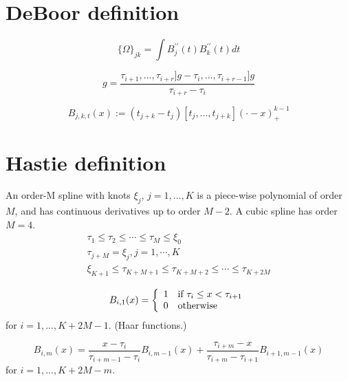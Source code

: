 \documentclass {article}
\begin{document}
\normalem  %

\section{DeBoor definition}

\begin{equation}
\lbrace \Omega \rbrace_{jk} = \int B_j^{\prime\prime}(t) B_k^{\prime\prime}(t) dt
\end{equation}

\begin{equation}
[ \tau_i,...,\tau_{i+r}]g = \frac{\tau_{i+1},...,\tau_{i+r}]g - \tau_i,...,\tau_{i+r-1}]g}{\tau_{i+r}-\tau_{i}}
\end{equation}

\begin{equation}
B_{j,k,t}(x) := (t_{j+k}-t_j)[t_j,...,t_{j+k}](\cdot - x)_+^{k-1}
\end{equation}

\section{Hastie definition}
An order-M spline with knots \({\xi}_j\), \(j=1,...,K\) is a piece-wise polynomial of order \(M\),
and has continuous derivatives up to order \(M-2\). A cubic spline has order \(M=4\).
\begin{equation}
\begin{array}{l}
\tau_1 \le \tau_2 \le \dotsi \le \tau_M \le \xi_0 \\
\tau_{j+M} = \xi_j, j=1,\dotsi,K \\
\xi_{K+1} \le \tau_{K+M+1} \le \tau_{K+M+2} \le \dotsi \le \tau_{K+2M}
\end{array}
\end{equation}

\begin{equation}
	B_{i,1}(x)
	= \left\{
  \begin{array}{l l}
  	1 & \text{if } \tau_i \le x < \tau_{i+1} \\
    0 & \text{otherwise} \\
  \end{array} \right.
\end{equation}
for \(i=1,...,K+2M-1\). (Haar functions.)

\begin{equation}
	B_{i,m}(x) = \frac{x-\tau_i}{\tau_{i+m-1}-\tau_i}B_{i,m-1}(x) + \frac{\tau_{i+m}-x}{\tau_{i+m}-\tau_{i+1}}B_{i+1,m-1}(x)
\end{equation}
for \(i=1,...,K+2M-m\).
\end{document}
